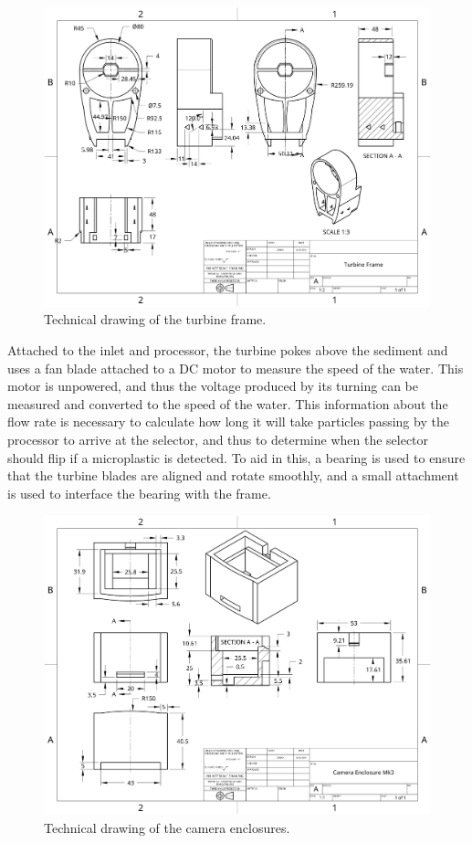 \documentclass[fleqn,10pt]{SelfArx} %
\begin{document}
		\begin{figure}[h]
			\centering
			\includegraphics[width=1\linewidth]{Figures/TechTurbine}
			\caption[Turbine Tech. Drawing]{Technical drawing of the turbine frame.}
			\label{fig:techturbine}
		\end{figure}
			Attached to the inlet and processor, the turbine pokes above the sediment and uses a fan blade attached to a DC motor to measure the speed of the water. This motor is unpowered, and thus the voltage produced by its turning can be measured and converted to the speed of the water. This information about the flow rate is necessary to calculate how long it will take particles passing by the processor to arrive at the selector, and thus to determine when the selector should flip if a microplastic is detected. To aid in this, a bearing is used to ensure that the turbine blades are aligned and rotate smoothly, and a small attachment is used to interface the bearing with the frame. 
		\begin{figure}[h]
			\centering
			\includegraphics[width=1\linewidth]{Figures/TechCamBox}
			\caption[Camera Box Tech. Drawing]{Technical drawing of the camera enclosures.}
			\label{fig:techCamBox}
		\end{figure}
\end{document}
